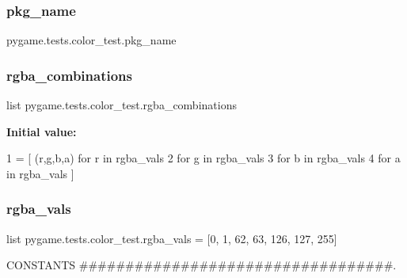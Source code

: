 \subsubsection{\texorpdfstring{pkg\+\_\+name}{pkg\_name}}
{\footnotesize\ttfamily pygame.\+tests.\+color\+\_\+test.\+pkg\+\_\+name}

\mbox{\label{namespacepygame_1_1tests_1_1color__test_a9d12bc87bd890c7aefa68ef25fe1dace}} 
\subsubsection{\texorpdfstring{rgba\+\_\+combinations}{rgba\_combinations}}
{\footnotesize\ttfamily list pygame.\+tests.\+color\+\_\+test.\+rgba\+\_\+combinations}

{\bfseries Initial value\+:}
\begin{DoxyCode}
1 =   [ (r,g,b,a) \textcolor{keywordflow}{for} r \textcolor{keywordflow}{in} rgba\_vals
2                                  \textcolor{keywordflow}{for} g \textcolor{keywordflow}{in} rgba\_vals
3                                  \textcolor{keywordflow}{for} b \textcolor{keywordflow}{in} rgba\_vals
4                                  \textcolor{keywordflow}{for} a \textcolor{keywordflow}{in} rgba\_vals ]
\end{DoxyCode}
\mbox{\label{namespacepygame_1_1tests_1_1color__test_aded5e3c877289f8fe140ddc4215c1e7d}} 
\subsubsection{\texorpdfstring{rgba\+\_\+vals}{rgba\_vals}}
{\footnotesize\ttfamily list pygame.\+tests.\+color\+\_\+test.\+rgba\+\_\+vals = \mbox{[}0, 1, 62, 63, 126, 127, 255\mbox{]}}



C\+O\+N\+S\+T\+A\+N\+TS \#\#\#\#\#\#\#\#\#\#\#\#\#\#\#\#\#\#\#\#\#\#\#\#\#\#\#\#\#\#\#\#\#\#. 

